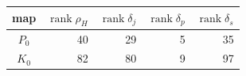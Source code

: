 \begin{tabular}{c|rrrr}
map & $\operatorname{rank}\rho_H$ & $\operatorname{rank}\delta_j$ & $\operatorname{rank}\delta_p$ & $\operatorname{rank}\delta_s$ \\
\hline
$P_0$ & 40 & 29 & 5 & 35 \\
$K_0$ & 82 & 80 & 9 & 97 \\
\end{tabular}
